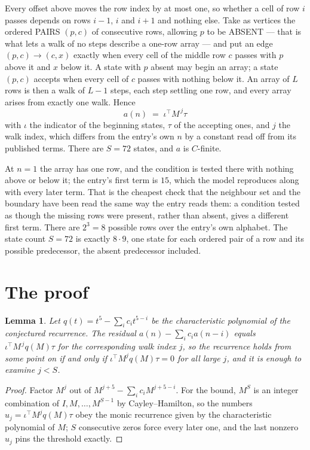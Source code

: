 \documentclass[11pt,a4paper]{article}
\theoremstyle{plain}
\newtheorem{lemma}[theorem]{Lemma}
\theoremstyle{definition}
\begin{document}
Every offset above moves the row index by at most one, so whether a cell of row $i$ passes
depends on rows $i-1$, $i$ and $i+1$ and nothing else. Take as vertices the ordered PAIRS
$(p,c)$ of consecutive rows, allowing $p$ to be ABSENT --- that is what lets a walk of no steps
describe a one-row array --- and put an edge $(p,c)\to(c,x)$ exactly when every cell of the
middle row $c$ passes with $p$ above it and $x$ below it. A state with $p$ absent may begin an
array; a state $(p,c)$ accepts when every cell of $c$ passes with nothing below it. An array of
$L$ rows is then a walk of $L-1$ steps, each step settling one row, and every array arises from
exactly one walk. Hence
\[
a(n)\;=\;\iota^{\!\top}M^{\,j}\tau
\]
with $\iota$ the indicator of the beginning states, $\tau$ of the accepting ones, and $j$ the
walk index, which differs from the entry's own $n$ by a constant read off from its published
terms. There are $S=72$ states, and $a$ is $C$-finite.

At $n=1$ the array has one row, and
the condition is tested there with nothing above or below it; the entry's first term is
$15$, which the model reproduces along with every later term. That is the cheapest check
that the neighbour set and the boundary have been read the same way the entry reads them: a
condition tested as though the missing rows were present, rather than absent, gives a different
first term. There are $2^{3}=8$ possible rows over the entry's own alphabet. The state count $S=72$ is exactly $8\cdot9$,
one state for each ordered pair of a row and its possible predecessor, the absent predecessor
included.

\section{The proof}

\begin{lemma}\label{lem:crit}
Let $q(t)=t^{5}-\sum_i c_it^{5-i}$ be the characteristic polynomial of the
conjectured recurrence. The residual $a(n)-\sum_ic_ia(n-i)$ equals
$\iota^{\!\top}M^{\,j}q(M)\tau$ for the corresponding walk index $j$, so the recurrence
holds from some point on if and only if $\iota^{\!\top}M^{j}q(M)\tau=0$ for all large $j$,
and it is enough to examine $j<S$.
\end{lemma}

\begin{proof}
Factor $M^{j}$ out of $M^{j+5}-\sum_ic_iM^{j+5-i}$. For the bound, $M^{S}$
is an integer combination of $I,M,\dots,M^{S-1}$ by Cayley--Hamilton, so the numbers
$u_j=\iota^{\!\top}M^{j}q(M)\tau$ obey the monic recurrence given by the characteristic
polynomial of $M$; $S$ consecutive zeros force every later one, and the last nonzero $u_j$
pins the threshold exactly.
\end{proof}
\end{document}

